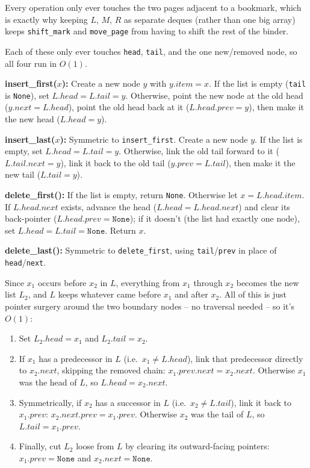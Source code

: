 \documentclass[12pt,twoside]{article}
\begin{document}
\begin{problems}
Every operation only ever touches the two pages adjacent to a bookmark, which is exactly why
keeping $L$, $M$, $R$ as separate deques (rather than one big array) keeps
\texttt{shift\_mark} and \texttt{move\_page} from having to shift the rest of the binder.

\newpage
\problem  %

\begin{problemparts}
\problempart %
Each of these only ever touches \texttt{head}, \texttt{tail}, and the one new/removed node,
so all four run in $O(1)$.

\textbf{insert\_first($x$):} Create a new node $y$ with $y.item = x$. If the list is empty
(\texttt{tail} is \texttt{None}), set $L.head = L.tail = y$. Otherwise, point the new node at
the old head ($y.next = L.head$), point the old head back at it ($L.head.prev = y$), then make
it the new head ($L.head = y$).

\textbf{insert\_last($x$):} Symmetric to \texttt{insert\_first}. Create a new node $y$. If the
list is empty, set $L.head = L.tail = y$. Otherwise, link the old tail forward to it
($L.tail.next = y$), link it back to the old tail ($y.prev = L.tail$), then make it the new
tail ($L.tail = y$).

\textbf{delete\_first():} If the list is empty, return \texttt{None}. Otherwise let
$x = L.head.item$. If $L.head.next$ exists, advance the head ($L.head = L.head.next$) and
clear its back-pointer ($L.head.prev = \texttt{None}$); if it doesn't (the list had exactly
one node), set $L.head = L.tail = \texttt{None}$. Return $x$.

\textbf{delete\_last():} Symmetric to \texttt{delete\_first}, using \texttt{tail}/\texttt{prev}
in place of \texttt{head}/\texttt{next}.

\problempart %
Since $x_1$ occurs before $x_2$ in $L$, everything from $x_1$ through $x_2$ becomes the new
list $L_2$, and $L$ keeps whatever came before $x_1$ and after $x_2$. All of this is just
pointer surgery around the two boundary nodes -- no traversal needed -- so it's $O(1)$:

\begin{enumerate}
\item Set $L_2.head = x_1$ and $L_2.tail = x_2$.
\item If $x_1$ has a predecessor in $L$ (i.e.\ $x_1 \ne L.head$), link that predecessor
directly to $x_2.next$, skipping the removed chain: $x_1.prev.next = x_2.next$. Otherwise
$x_1$ was the head of $L$, so $L.head = x_2.next$.
\item Symmetrically, if $x_2$ has a successor in $L$ (i.e.\ $x_2 \ne L.tail$), link it back to
$x_1.prev$: $x_2.next.prev = x_1.prev$. Otherwise $x_2$ was the tail of $L$, so
$L.tail = x_1.prev$.
\item Finally, cut $L_2$ loose from $L$ by clearing its outward-facing pointers:
$x_1.prev = \texttt{None}$ and $x_2.next = \texttt{None}$.
\end{enumerate}


\end{problemparts}
\end{problems}
\end{document}
